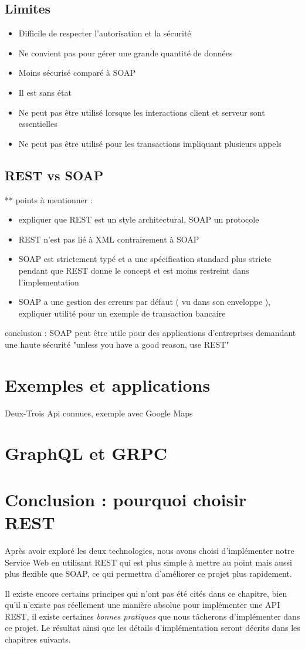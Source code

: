 \subsection{Limites}
\begin{itemize}
	\item Difficile de respecter l'autorisation et la sécurité
	\item Ne convient pas pour gérer une grande quantité de données
	\item Moins sécurisé comparé à SOAP
	\item Il est sans état
	\item Ne peut pas être utilisé lorsque les interactions client et serveur sont essentielles
	\item Ne peut pas être utilisé pour les transactions impliquant plusieurs appels
\end{itemize}
\subsection{REST vs SOAP}
** points à mentionner : 
\begin{itemize}
	\item expliquer que REST est un style architectural, SOAP un protocole
	\item REST n'est pas lié à XML contrairement à SOAP
	\item SOAP est strictement typé et a une spécification standard plus stricte pendant que REST donne le concept et est moins restreint dans l'implementation 
	\item SOAP a une gestion des erreurs par défaut ( vu dans son enveloppe ), expliquer utilité pour un exemple de transaction bancaire
\end{itemize}				 
			
conclusion : SOAP peut être utile pour des applications d'entreprises demandant une haute sécurité "unless you have a good reason, use REST" 
\section{Exemples et applications}
Deux-Trois Api connues, exemple avec Google Maps
\section{GraphQL et GRPC}
			
\section{Conclusion : pourquoi choisir REST}
	Après avoir exploré les deux technologies, nous avons choisi d'implémenter notre Service Web en utilisant REST qui est plus simple à mettre au point mais aussi plus flexible que SOAP, ce qui permettra d'améliorer ce projet plus rapidement.
	
	Il existe encore certains principes qui n'ont pas été cités dans ce chapitre, bien qu'il n'existe pas réellement une manière absolue pour implémenter une API REST, il existe certaines \emph{bonnes pratiques} que nous tâcherons d'implémenter dans ce projet. Le résultat ainsi que les détails d'implémentation seront décrits dans les chapitres suivants.